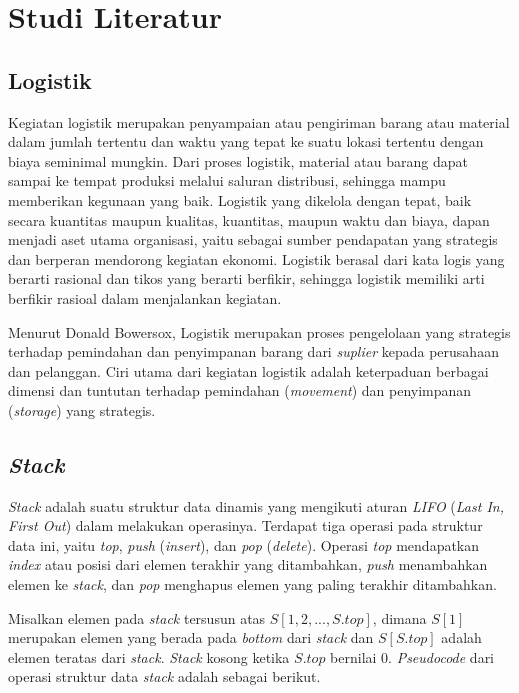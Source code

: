 \chapter{Studi Literatur}

\section{Logistik}

Kegiatan logistik merupakan penyampaian atau pengiriman barang atau material dalam 
jumlah tertentu dan waktu yang tepat ke suatu lokasi tertentu dengan biaya seminimal 
mungkin. Dari proses logistik, material atau barang dapat sampai ke tempat produksi 
melalui saluran distribusi, sehingga mampu memberikan kegunaan yang baik. Logistik yang 
dikelola dengan tepat, baik secara kuantitas maupun kualitas, kuantitas, maupun waktu 
dan biaya, dapan menjadi aset utama organisasi, yaitu sebagai sumber pendapatan yang 
strategis dan berperan mendorong kegiatan ekonomi. Logistik berasal dari kata logis yang 
berarti rasional dan tikos yang berarti berfikir, sehingga logistik memiliki arti 
berfikir rasioal dalam menjalankan kegiatan. 

Menurut Donald Bowersox, Logistik merupakan proses pengelolaan yang strategis terhadap 
pemindahan dan penyimpanan barang dari \textit{suplier} kepada perusahaan dan 
pelanggan. Ciri utama dari kegiatan logistik adalah keterpaduan berbagai dimensi dan 
tuntutan terhadap pemindahan (\textit{movement}) dan penyimpanan (\textit{storage}) yang 
strategis.


\section{\textit{Stack}}

\textit{Stack} adalah suatu struktur data dinamis yang mengikuti aturan \textit{LIFO} 
(\textit{Last In, First Out}) dalam melakukan operasinya. Terdapat tiga operasi pada 
struktur data ini, yaitu \textit{top}, \textit{push} (\textit{insert}), dan \textit{pop} 
(\textit{delete}). Operasi \textit{top} mendapatkan \textit{index} atau posisi dari 
elemen terakhir yang ditambahkan, \textit{push} menambahkan elemen ke \textit{stack}, 
dan \textit{pop} menghapus elemen yang paling terakhir ditambahkan.

Misalkan elemen pada \textit{stack} tersusun atas $S[1, 2, ..., S.top]$, dimana $S[1]$ 
merupakan elemen yang berada pada \textit{bottom} dari \textit{stack} dan $S[S.top]$ 
adalah elemen teratas dari \textit{stack}. \textit{Stack} kosong ketika $S.top$ bernilai 
0. \textit{Pseudocode} dari operasi struktur data \textit{stack} adalah sebagai berikut.

